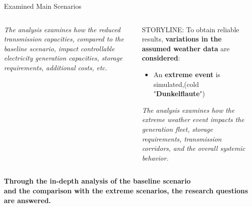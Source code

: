 \documentclass[aspectratio=169]{beamer}
\begin{document}
\begin{frame}{Examined Main Scenarios}
\begin{columns}
\begin{column}{0.32\textwidth}
\begin{coloredblock}
\begin{minipage}[t][2cm]{0.9\textwidth}
                \end{minipage}
                \begin{minipage}[t][3.7cm]{0.9\textwidth} 
                    \scriptsize \textit{The analysis examines how the reduced transmission capacities, compared to the baseline scenario, impact controllable electricity generation capacities, storage requirements, additional costs, etc.}
                \end{minipage}
            \end{coloredblock}
        \end{column}
        \begin{column}{0.32\textwidth}
            \begin{coloredblock}
                \begin{minipage}[t][2.5cm]{0.9\textwidth} 
                    \scriptsize STORYLINE: To obtain reliable results, \textbf{variations in the assumed weather data} are \textbf{considered}:
                \end{minipage}
                \begin{minipage}[t][2cm]{0.9\textwidth}
                    \begin{itemize}
                        \item \scriptsize An \textbf{extreme event} is simulated,(cold "\textbf{Dunkelflaute}")
                    \end{itemize}
                \end{minipage}
                \begin{minipage}[t][3.7cm]{0.9\textwidth} 
                    \scriptsize \textit{The analysis examines how the extreme weather event impacts the generation fleet, storage requirements, transmission corridors, and the overall systemic behavior.}
                \end{minipage}
            \end{coloredblock}
        \end{column}
    \end{columns}

    \vspace{0.2cm}
    \begin{coloredblock}[grey]
        \centering
        \footnotesize\textbf{Through the in-depth analysis of the baseline scenario \\
        and the comparison with the extreme scenarios, the research questions are answered.}
    \end{coloredblock}

\end{frame}
\end{document}
